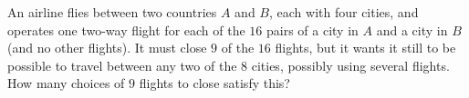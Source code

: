 An airline flies between two countries $A$ and $B$, each with four cities, and operates one two-way flight for each of the $16$ pairs of a city in $A$ and a city in $B$ (and no other flights). It must close $9$ of the $16$ flights, but it wants it still to be possible to travel between any two of the $8$ cities, possibly using several flights. How many choices of $9$ flights to close satisfy this?
